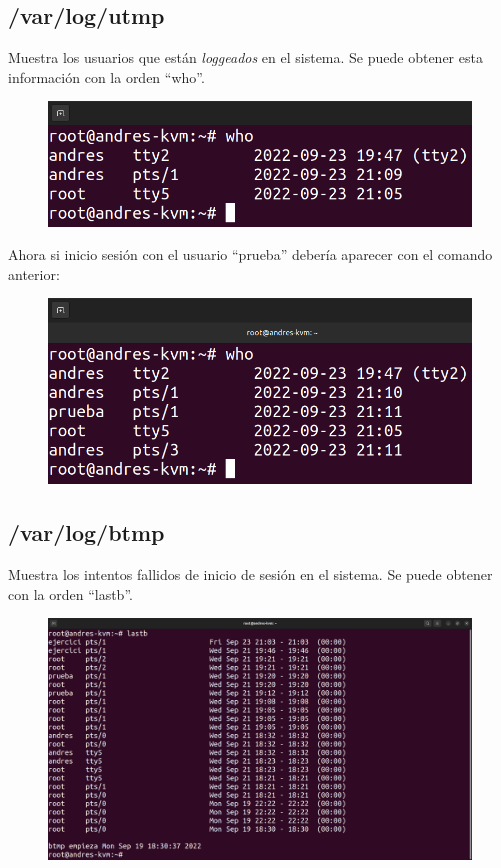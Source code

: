 \documentclass{article}
\begin{document}
\subsection*{/var/log/utmp}
Muestra los usuarios que están \textit{loggeados} en el sistema. Se puede obtener esta información con la orden ``who''.

\begin{figure}[H]
    \includegraphics[width=\textwidth]{imagenes/whonormal.png}
\end{figure}

Ahora si inicio sesión con el usuario ``prueba'' debería aparecer con el comando anterior:

\begin{figure}[H]
    \includegraphics[width=\textwidth]{imagenes/whoprueba.png}
\end{figure}

\subsection*{/var/log/btmp}
Muestra los intentos fallidos de inicio de sesión en el sistema. Se puede obtener con la orden ``lastb''.

\begin{figure}[H]
    \includegraphics[width=\textwidth]{imagenes/lastbnormal.png}
\end{figure}
\end{document}
